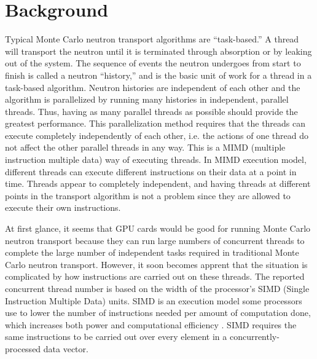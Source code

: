 \documentclass[preprint,12pt]{elsarticle}
\begin{document}
\section{Background}
\label{sec:background}

Typical Monte Carlo neutron transport algorithms are ``task-based.''  A thread will transport the neutron until it is terminated through absorption or by leaking out of the system.  The sequence of events the neutron undergoes from start to finish is called a neutron ``history,'' and is the basic unit of work for a thread in a task-based algorithm.  Neutron histories are independent of each other and the algorithm is parallelized by running many histories in independent, parallel threads.  Thus, having as many parallel threads as possible should provide the greatest performance.  This parallelization method requires that the threads can execute completely independently of each other, i.e. the actions of one thread do not affect the other parallel threads in any way.  This is a MIMD (multiple instruction multiple data) way of executing threads.  In MIMD execution model, different threads can execute different instructions on their data at a point in time.  Threads appear to completely independent, and having threads at different points in the transport algorithm is not a problem since they are allowed to execute their own instructions.

At first glance, it seems that GPU cards would be good for running Monte Carlo neutron transport because they can run large numbers of concurrent threads to complete the large number of independent tasks required in traditional Monte Carlo neutron transport.  However, it soon becomes apprent that the situation is complicated by how instructions are carried out on these threads.  The reported concurrent thread number is based on the width of the processor's SIMD (Single Instruction Multiple Data) units.  SIMD is an execution model some processors use to lower the number of instructions needed per amount of computation done, which increases both power and computational efficiency \cite{simd_power}.  SIMD requires the same instructions to be carried out over every element in a concurrently-processed data vector.  
\end{document}
